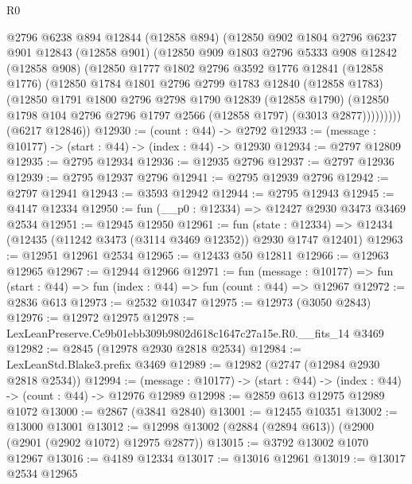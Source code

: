 \begin{lexlean}{R0}
\begin{coremodule}
          @2796
          @6238
          @894
          @12844
          (@12858 @894)
          (@12850
            @902
            @1804
            @2796
            @6237
            @901
            @12843
            (@12858 @901)
            (@12850
              @909
              @1803
              @2796
              @5333
              @908
              @12842
              (@12858 @908)
              (@12850
                @1777
                @1802
                @2796
                @3592
                @1776
                @12841
                (@12858 @1776)
                (@12850
                  @1784
                  @1801
                  @2796
                  @2799
                  @1783
                  @12840
                  (@12858 @1783)
                  (@12850
                    @1791
                    @1800
                    @2796
                    @2798
                    @1790
                    @12839
                    (@12858 @1790)
                    (@12850 @1798 @104 @2796 @2796 @1797 @2566 (@12858 @1797) (@3013 @2877)))))))))
      (@6217 @12846))
@12930 := (count : @44) -> @2792
@12933 := (message : @10177) -> (start : @44) -> (index : @44) -> @12930
@12934 := @2797 @12809
@12935 := @2795 @12934
@12936 := @12935 @2796
@12937 := @2797 @12936
@12939 := @2795 @12937 @2796
@12941 := @2795 @12939 @2796
@12942 := @2797 @12941
@12943 := @3593 @12942
@12944 := @2795 @12943
@12945 := @4147 @12334
@12950 := fun (__p0 : @12334) => @12427 @2930 @3473 @3469 @2534
@12951 := @12945 @12950
@12961 := fun (state : @12334) =>
  @12434 (@12435 (@11242 @3473 (@3114 @3469 @12352)) @2930 @1747 @12401)
@12963 := @12951 @12961 @2534
@12965 := @12433 @50 @12811
@12966 := @12963 @12965
@12967 := @12944 @12966
@12971 := fun (message : @10177) =>
  fun (start : @44) => fun (index : @44) => fun (count : @44) => @12967
@12972 := @2836 @613
@12973 := @2532 @10347
@12975 := @12973 (@3050 @2843)
@12976 := @12972 @12975
@12978 := LexLeanPreserve.Ce9b01ebb309b9802d618c1647c27a15e.R0.__fits_14 @3469
@12982 := @2845 (@12978 @2930 @2818 @2534)
@12984 := LexLeanStd.Blake3.prefix @3469
@12989 := @12982 (@2747 (@12984 @2930 @2818 @2534))
@12994 := (message : @10177) -> (start : @44) -> (index : @44) -> (count : @44) -> @12976 @12989
@12998 := @2859 @613 @12975 @12989 @1072
@13000 := @2867 (@3841 @2840)
@13001 := @12455 @10351
@13002 := @13000 @13001
@13012 := @12998 @13002 (@2884 (@2894 @613)) (@2900 (@2901 (@2902 @1072) @12975 @2877))
@13015 := @3792 @13002 @1070 @12967
@13016 := @4189 @12334
@13017 := @13016 @12961
@13019 := @13017 @2534 @12965

\end{coremodule}
\end{lexlean}

